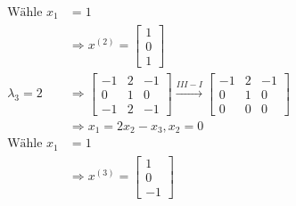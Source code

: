 \begin{align*}
\text{Wähle } x_1 &= 1\\
&\Rightarrow x^{(2)} = \begin{bmatrix}
1\\
0\\
1
\end{bmatrix}\\
\lambda_3 = 2 &\Rightarrow \begin{bmatrix}
-1 & 2 & -1\\
0 & 1 & 0 \\
-1 & 2 & -1
\end{bmatrix}\overset{III-I}{\rightarrow}
\begin{bmatrix}
-1 & 2 & -1\\
0 & 1 & 0 \\
0 & 0 & 0
\end{bmatrix}\\
&\Rightarrow x_1 =2x_2 - x_3, x_2 = 0\\
\text{Wähle } x_1 &= 1\\
&\Rightarrow x^{(3)} = \begin{bmatrix}
1\\
0\\
-1
\end{bmatrix}
\end{align*}
